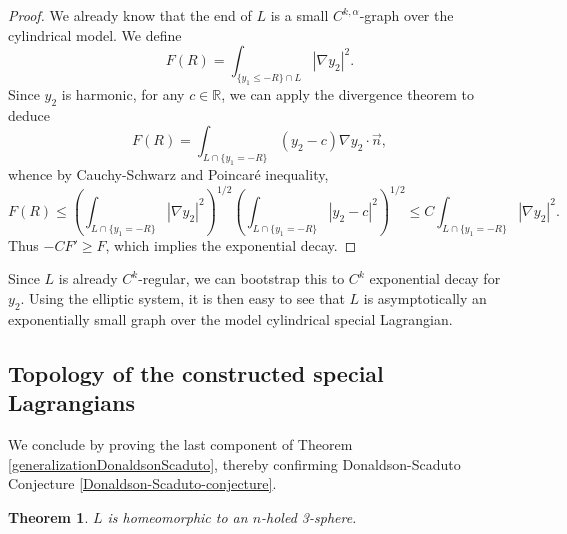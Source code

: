 \documentclass[11pt]{article}
\newtheorem{theorem}{Theorem}
\begin{document}
\begin{proof}
We already know that the end of $L$ is a small $C^{k,\alpha}$-graph over the cylindrical model. We define 
\[
F(R) = \int_{ \{y_1\leq -R\} \cap L} |\nabla y_2 |^2 .
\]
Since $y_2$ is harmonic,  for any $c\in \mathbb{R}$, we can apply the divergence theorem to deduce
\[
F(R)= \int_{  L\cap \{ y_1=-R\} } (y_2-c) \nabla y_2 \cdot \vec{n} ,
\]
whence by Cauchy-Schwarz and Poincar\'e inequality,
\[
F(R) \leq  (\int_{ L\cap \{ y_1=-R\}   } |\nabla y_2|^2)^{1/2 } (\int_{ L\cap \{ y_1=-R\}   } |y_2-c|^2)^{1/2 } \leq C\int_{ L\cap \{ y_1=-R\}   } |\nabla y_2|^2.
\]
Thus $-CF' \geq F$, which implies the exponential decay.
\end{proof}




Since $L$ is already $C^k$-regular, we can bootstrap this to $C^k$ exponential decay for $y_2$. Using the elliptic system, it is then easy to see that $L$ is asymptotically an exponentially small graph over the model cylindrical special Lagrangian.






\subsection{Topology of the constructed special Lagrangians}\label{topology}

We conclude by proving the last component of Theorem \ref{generalizationDonaldsonScaduto}, thereby confirming Donaldson-Scaduto Conjecture \ref{Donaldson-Scaduto-conjecture}.

\begin{theorem}
    $L$ is homeomorphic to an $n$-holed 3-sphere.
\end{theorem}
\end{document}
